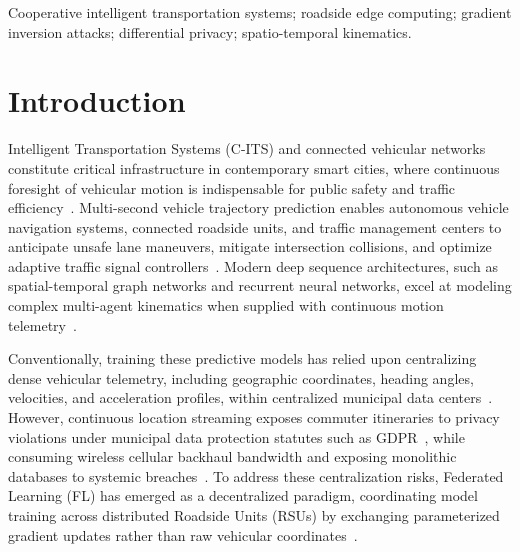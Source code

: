 \documentclass[journal]{IEEEtran}
\begin{document}
\begin{IEEEkeywords}
Cooperative intelligent transportation systems; roadside edge computing; gradient inversion attacks; differential privacy; spatio-temporal kinematics.
\end{IEEEkeywords}

\section{Introduction}
\label{sec:introduction}
 Intelligent Transportation Systems (C-ITS) and connected vehicular networks constitute critical infrastructure in contemporary smart cities, where continuous foresight of vehicular motion is indispensable for public safety and traffic efficiency~\cite{zhao2026digitaltwin}. Multi-second vehicle trajectory prediction enables autonomous vehicle navigation systems, connected roadside units, and traffic management centers to anticipate unsafe lane maneuvers, mitigate intersection collisions, and optimize adaptive traffic signal controllers~\cite{alhuthaifi2024fedagat,meese2024adaptive}. Modern deep sequence architectures, such as spatial-temporal graph networks and recurrent neural networks, excel at modeling complex multi-agent kinematics when supplied with continuous motion telemetry~\cite{shen2024decentralized}.

Conventionally, training these predictive models has relied upon centralizing dense vehicular telemetry, including geographic coordinates, heading angles, velocities, and acceleration profiles, within centralized municipal data centers~\cite{ni2024federated}. However, continuous location streaming exposes commuter itineraries to privacy violations under municipal data protection statutes such as GDPR~\cite{han2022federated,crivellari2026federated}, while consuming wireless cellular backhaul bandwidth and exposing monolithic databases to systemic breaches~\cite{zhang2022communication,zafar2024federated,reddy2026zero}. To address these centralization risks, Federated Learning (FL) has emerged as a decentralized paradigm, coordinating model training across distributed Roadside Units (RSUs) by exchanging parameterized gradient updates rather than raw vehicular coordinates~\cite{mcmahan2017communication,li2020federated,liu2025trajectory,li2025fedsectp}.
\end{document}
